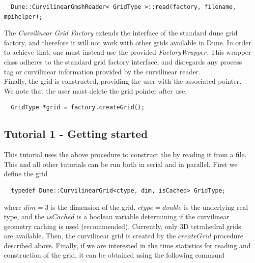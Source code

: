\begin{mybox}
\begin{lstlisting}
  Dune::CurvilinearGmshReader< GridType >::read(factory, filename, mpihelper); 
\end{lstlisting}
\end{mybox}

\noindent
The \textit{Curvilinear Grid Factory} extends the interface of the standard dune grid factory, and therefore it will not work with other grids available in Dune. In order to achieve that, one must instead use the provided \textit{FactoryWrapper}. This wrapper class adheres to the standard grid factory interface, and disregards any process tag or curvilinear information provided by the curvilinear \gmsh{} reader. \\

\noindent
Finally, the grid is constructed, providing the user with the associated pointer. We note that the user must delete the grid pointer after use. %

\begin{mybox}
\begin{lstlisting}
  GridType *grid = factory.createGrid();
\end{lstlisting}
\end{mybox}

\subsection{Tutorial 1 - Getting started}
\label{usage-howto-tutorial-gettingstarted}

\noindent
This tutorial uses the above procedure to construct the \curvgrid{} by reading it from a \gmsh{} file. This and all other tutorials can be run both in serial and in parallel. First we define the grid \\

\begin{mybox}
\begin{lstlisting}
  typedef Dune::CurvilinearGrid<ctype, dim, isCached> GridType;
\end{lstlisting}
\end{mybox}

\noindent
where $dim=3$ is the dimension of the grid, $ctype=double$ is the underlying real type, and the $isCached$ is a boolean variable determining if the curvilinear geometry caching is used (recommended). Currently, only 3D tetrahedral grids are available. Then, the curvilinear grid is created by the $createGrid$ procedure described above. Finally, if we are interested in the time statistics for reading and construction of the grid, it can be obtained using the following command \\

